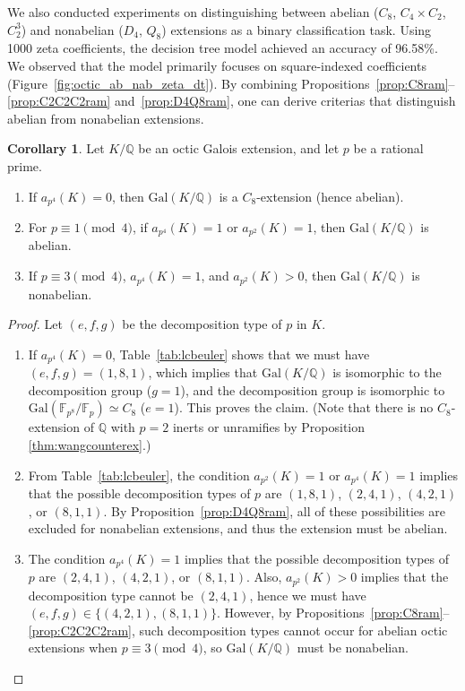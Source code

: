 \documentclass[letterpaper, 10pt]{article}
\newcommand{\Gal}{\mathrm{Gal}}
\newcommand{\bF}{\mathbb{F}}
\newcommand{\bQ}{\mathbb{Q}}
\newcommand{\1}{\mathds{1}}	%
\theoremstyle{definition}
\newtheorem{corollary}[theorem]{Corollary}
\theoremstyle{remark}
\begin{document}
We also conducted experiments on distinguishing between abelian (\( C_8 \), \( C_4 \times C_2 \), \( C_2^3 \)) and nonabelian (\( D_4 \), \( Q_8 \)) extensions as a binary classification task. Using 1000 zeta coefficients, the decision tree model achieved an accuracy of  96.58\%. We observed that the model primarily focuses on square-indexed coefficients (Figure~\ref{fig:octic_ab_nab_zeta_dt}). By combining Propositions~\ref{prop:C8ram}--\ref{prop:C2C2C2ram} and~\ref{prop:D4Q8ram}, one can derive criterias that distinguish abelian from nonabelian extensions.

\begin{corollary}
    \label{cor:octic_ab_nab}
    Let \( K / \bQ \) be an octic Galois extension, and let \( p \) be a rational prime.
    \begin{enumerate}
        \item If \( a_{p^4}(K) = 0 \), then \( \Gal(K / \bQ) \) is a \(C_8\)-extension (hence abelian).
        \item For \( p \equiv 1 \pmod{4} \), if  \( a_{p^4}(K) = 1 \) or \( a_{p^2}(K)=1  \), then \( \Gal(K / \bQ) \) is abelian.
        \item If \( p \equiv 3 \pmod{4} \), \( a_{p^4}(K) = 1 \), and \( a_{p^2}(K) > 0 \), then \( \Gal(K / \bQ) \) is nonabelian.
    \end{enumerate}
\end{corollary}
\begin{proof}
    Let \( (e, f, g) \) be the decomposition type of \( p \) in \( K \).

    \begin{enumerate}
        \item  If \(a_{p^4}(K) = 0\), Table~\ref{tab:lcbeuler} shows that we must have \((e, f, g) = (1, 8, 1)\), which implies  that $\Gal(K / \bQ)$ is isomorphic to the decomposition group ($g = 1$), and the decomposition group is isomorphic to $\Gal(\bF_{p^8} / \bF_p) \simeq C_8$ ($e = 1$).
        This proves the claim.
         (Note that there is no $C_8$-extension of $\bQ$ with $p = 2$ inerts or unramifies by Proposition \ref{thm:wangcounterex}.)
        \item  From Table~\ref{tab:lcbeuler}, the condition \(a_{p^2}(K) = 1\) or \(a_{p^4}(K) = 1\) implies that the possible decomposition types of \(p\) are \((1, 8, 1)\), \((2, 4, 1)\), \((4, 2, 1)\), or \((8, 1, 1)\). By Proposition~\ref{prop:D4Q8ram}, all of these possibilities are excluded for nonabelian extensions, and thus the extension must be abelian.

        \item The condition \( a_{p^4}(K) = 1 \) implies that the possible decomposition types of \( p \) are \( (2, 4, 1) \), \( (4, 2, 1) \), or \( (8, 1, 1) \).  
        Also, \( a_{p^2}(K) > 0 \) implies that the decomposition type cannot be \( (2, 4, 1) \), hence we must have \( (e, f, g) \in \{(4, 2, 1), (8, 1, 1)\} \).  
        However, by Propositions~\ref{prop:C8ram}--\ref{prop:C2C2C2ram}, such decomposition types cannot occur for abelian octic extensions when \( p \equiv 3 \pmod{4} \), so \( \Gal(K / \mathbb{Q}) \) must be nonabelian. \qedhere
    \end{enumerate}
\end{proof}
\end{document}
